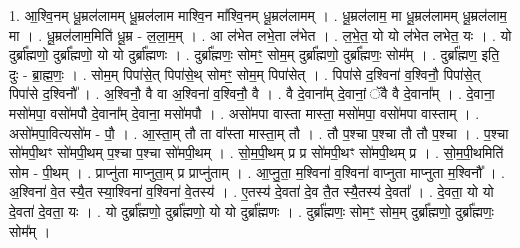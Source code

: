 \documentclass[17pt]{extarticle}
\begin{document}
1. आ॒श्वि॒नम् धू॒म्रल॑लामम् धू॒म्रल॑लाम माश्वि॒न मा᳚श्वि॒नम् धू॒म्रल॑लामम् । . धू॒म्रल॑लाम॒ मा धू॒म्रल॑लामम् धू॒म्रल॑लाम॒ मा । . धू॒म्रल॑लाम॒मिति॑ धू॒म्र - ल॒ला॒म॒म् । . आ ल॑भेत लभे॒ता ल॑भेत । . ल॒भे॒त॒ यो यो ल॑भेत लभेत॒ यः । . यो दुर्ब्रा᳚ह्मणो॒ दुर्ब्रा᳚ह्मणो॒ यो यो दुर्ब्रा᳚ह्मणः । . दुर्ब्रा᳚ह्मणः॒ सोमꣳ॒॒ सोम॒म् दुर्ब्रा᳚ह्मणो॒ दुर्ब्रा᳚ह्मणः॒ सोम᳚म् । . दुर्ब्रा᳚ह्मण॒ इति॒ दुः - ब्रा॒ह्म॒णः॒ । . सोम॒म् पिपा॑से॒त् पिपा॑से॒थ् सोमꣳ॒॒ सोम॒म् पिपा॑सेत् । . पिपा॑से द॒श्विना॑ व॒श्विनौ॒ पिपा॑से॒त् पिपा॑से द॒श्विनौ᳚ । . अ॒श्विनौ॒ वै वा अ॒श्विना॑ व॒श्विनौ॒ वै । . वै दे॒वाना᳚म् दे॒वानां॒ ॅवै वै दे॒वाना᳚म् । . दे॒वाना॒ मसो॑मपा॒ वसो॑मपौ दे॒वाना᳚म् दे॒वाना॒ मसो॑मपौ । . असो॑मपा वास्ता मास्ता॒ मसो॑मपा॒ वसो॑मपा वास्ताम् । . असो॑मपा॒वित्यसो॑म - पौ॒ । . आ॒स्ता॒म् तौ ता वा᳚स्ता मास्ता॒म् तौ । . तौ प॒श्चा प॒श्चा तौ तौ प॒श्चा । . प॒श्चा सो॑मपी॒थꣳ सो॑मपी॒थम् प॒श्चा प॒श्चा सो॑मपी॒थम् । . सो॒म॒पी॒थम् प्र प्र सो॑मपी॒थꣳ सो॑मपी॒थम् प्र । . सो॒म॒पी॒थमिति॑ सोम - पी॒थम् । . प्राप्नु॑ता माप्नुता॒म् प्र प्राप्नु॑ताम् । . आ॒प्नु॒ता॒ म॒श्विना॑ व॒श्विना॑ वाप्नुता माप्नुता म॒श्विनौ᳚ । . अ॒श्विना॑ वे॒त स्यै॒त स्या॒श्विना॑ व॒श्विना॑ वे॒तस्य॑ । . ए॒तस्य॑ दे॒वता॑ दे॒व तै॒त स्यै॒तस्य॑ दे॒वता᳚ । . दे॒वता॒ यो यो दे॒वता॑ दे॒वता॒ यः । . यो दुर्ब्रा᳚ह्मणो॒ दुर्ब्रा᳚ह्मणो॒ यो यो दुर्ब्रा᳚ह्मणः । . दुर्ब्रा᳚ह्मणः॒ सोमꣳ॒॒ सोम॒म् दुर्ब्रा᳚ह्मणो॒ दुर्ब्रा᳚ह्मणः॒ सोम᳚म् । \newline
\end{document}
